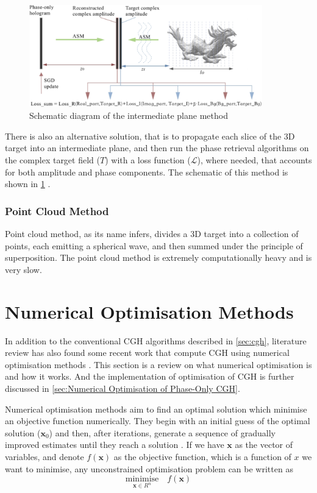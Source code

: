 \begin{figure}[H]
  \centering
  \includegraphics[width=0.9\textwidth]{intermediate_plane.png}
  \caption{Schematic diagram of the intermediate plane method \cite{Chen2021}}
  \label{fig:intermediate_plane}
\end{figure}

There is also an alternative solution, that is to propagate each slice of the 3D target into an intermediate plane, and then run the phase retrieval algorithms on the complex target field ($T$) with a loss function ($\mathcal{L} $), where needed, that accounts for both amplitude and phase components. The schematic of this method is shown in \cref{fig:intermediate_plane} \cite{Chen2021}.


\subsubsection{Point Cloud Method}
Point cloud method, as its name infers, divides a 3D target into a collection of points, each emitting a spherical wave, and then summed under the principle of superposition. The point cloud method is extremely computationally heavy and is very slow.



\newpage
\section{Numerical Optimisation Methods} \label{sec:Numerical Optimisation Methods}
In addition to the conventional CGH algorithms described in \cref{sec:cgh}, literature review has also found some recent work that compute CGH using numerical optimisation methods \cite{Zhang2017, Liu2020, Choi2021, Chen2021, Kadis2022}. This section is a review on what numerical optimisation is and how it works. And the implementation of optimisation of CGH is further discussed in \cref{sec:Numerical Optimisation of Phase-Only CGH}.

Numerical optimisation methods aim to find an optimal solution which minimise an objective function numerically. They begin with an initial guess of the optimal solution ($\textbf{x}_{0}$) and then, after iterations, generate a sequence of gradually improved estimates until they reach a solution \cite{Nocedal2006}. If we have $\textbf{x}$ as the vector of variables, and denote $f(\textbf{x})$ as the objective function, which is a function of $x$ we want to minimise, any unconstrained optimisation problem can be written as
\begin{equation}
  \underset{\textbf{x}\in R^n}{\text{minimise}}\quad f(\textbf{x})
  \label{eq:minimise_F}
\end{equation}

